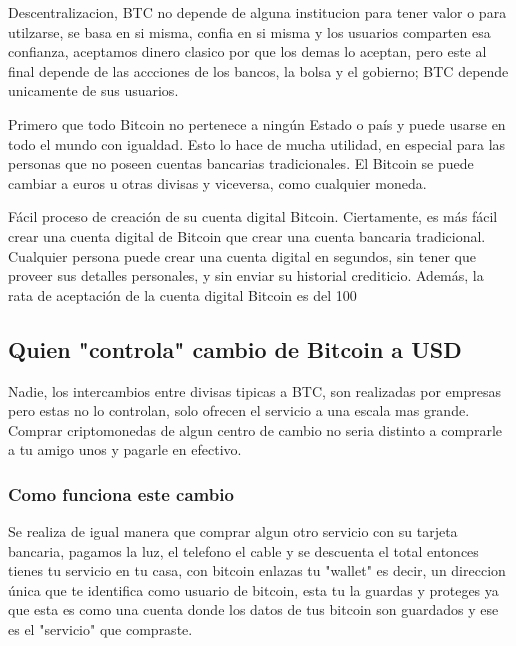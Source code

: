 \documentclass[12pt,letterpaper]{article}
\begin{document}
	Descentralizacion, BTC no depende de alguna institucion para tener valor o para utilzarse, se basa en si misma, confia en si misma y los usuarios comparten esa confianza, aceptamos dinero clasico por que los demas lo aceptan, pero este al final depende de las accciones de los bancos, la bolsa y el gobierno; BTC depende unicamente de sus usuarios.
	
	Primero que todo Bitcoin no pertenece a ning\'un Estado o pa\'is y puede usarse en todo el mundo con igualdad. Esto lo hace de mucha utilidad, en especial para las personas que no poseen cuentas bancarias tradicionales. El Bitcoin se puede cambiar a euros u otras divisas y viceversa, como cualquier moneda. 
	
	F\'acil proceso de creaci\'on de su cuenta digital Bitcoin. Ciertamente, es m\'as f\'acil crear una cuenta digital de Bitcoin que crear una cuenta bancaria tradicional. Cualquier persona puede crear una cuenta digital en segundos, sin tener que proveer sus detalles personales, y sin enviar su historial crediticio. Adem\'as, la rata de aceptaci\'on de la cuenta digital Bitcoin es del 100%
	
	\subsection*{Quien "controla" cambio de Bitcoin a USD}
	Nadie, los intercambios entre divisas tipicas a BTC, son realizadas por empresas pero estas no lo controlan, solo ofrecen el servicio a una escala mas grande. Comprar criptomonedas de algun centro de cambio no seria distinto a comprarle a tu amigo unos y pagarle en efectivo.
		\subsubsection*{Como funciona este cambio}
        Se realiza de igual manera que comprar algun otro servicio con su tarjeta bancaria, pagamos la luz, el telefono el cable y se descuenta el total entonces tienes tu servicio en tu casa, con bitcoin enlazas tu "wallet" es decir, un direccion \'unica que te identifica como usuario de bitcoin, esta tu la guardas y proteges ya que esta es como una cuenta donde los datos de tus bitcoin son guardados y ese es el "servicio" que compraste.
        
\end{document}
